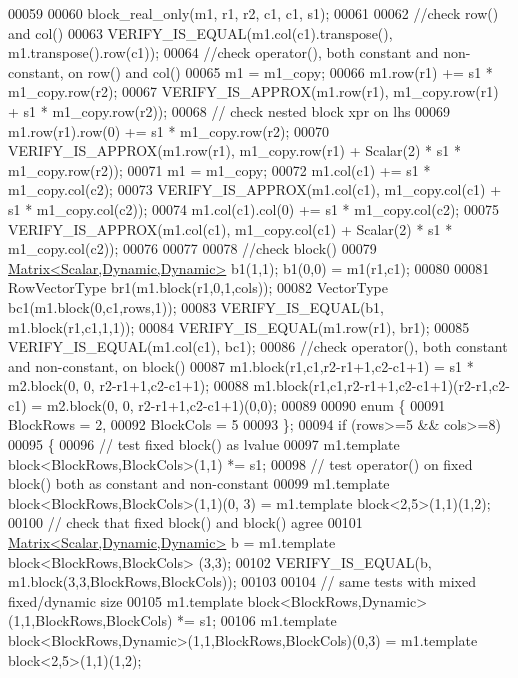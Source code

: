 \begin{DoxyCode}
00059 
00060   block\_real\_only(m1, r1, r2, c1, c1, s1);
00061 
00062   \textcolor{comment}{//check row() and col()}
00063   VERIFY\_IS\_EQUAL(m1.col(c1).transpose(), m1.transpose().row(c1));
00064   \textcolor{comment}{//check operator(), both constant and non-constant, on row() and col()}
00065   m1 = m1\_copy;
00066   m1.row(r1) += s1 * m1\_copy.row(r2);
00067   VERIFY\_IS\_APPROX(m1.row(r1), m1\_copy.row(r1) + s1 * m1\_copy.row(r2));
00068   \textcolor{comment}{// check nested block xpr on lhs}
00069   m1.row(r1).row(0) += s1 * m1\_copy.row(r2);
00070   VERIFY\_IS\_APPROX(m1.row(r1), m1\_copy.row(r1) + Scalar(2) * s1 * m1\_copy.row(r2));
00071   m1 = m1\_copy;
00072   m1.col(c1) += s1 * m1\_copy.col(c2);
00073   VERIFY\_IS\_APPROX(m1.col(c1), m1\_copy.col(c1) + s1 * m1\_copy.col(c2));
00074   m1.col(c1).col(0) += s1 * m1\_copy.col(c2);
00075   VERIFY\_IS\_APPROX(m1.col(c1), m1\_copy.col(c1) + Scalar(2) * s1 * m1\_copy.col(c2));
00076   
00077   
00078   \textcolor{comment}{//check block()}
00079   \hyperlink{group___core___module}{Matrix<Scalar,Dynamic,Dynamic>} b1(1,1); b1(0,0) = m1(r1,c1);
00080 
00081   RowVectorType br1(m1.block(r1,0,1,cols));
00082   VectorType bc1(m1.block(0,c1,rows,1));
00083   VERIFY\_IS\_EQUAL(b1, m1.block(r1,c1,1,1));
00084   VERIFY\_IS\_EQUAL(m1.row(r1), br1);
00085   VERIFY\_IS\_EQUAL(m1.col(c1), bc1);
00086   \textcolor{comment}{//check operator(), both constant and non-constant, on block()}
00087   m1.block(r1,c1,r2-r1+1,c2-c1+1) = s1 * m2.block(0, 0, r2-r1+1,c2-c1+1);
00088   m1.block(r1,c1,r2-r1+1,c2-c1+1)(r2-r1,c2-c1) = m2.block(0, 0, r2-r1+1,c2-c1+1)(0,0);
00089 
00090   \textcolor{keyword}{enum} \{
00091     BlockRows = 2,
00092     BlockCols = 5
00093   \};
00094   \textcolor{keywordflow}{if} (rows>=5 && cols>=8)
00095   \{
00096     \textcolor{comment}{// test fixed block() as lvalue}
00097     m1.template block<BlockRows,BlockCols>(1,1) *= s1;
00098     \textcolor{comment}{// test operator() on fixed block() both as constant and non-constant}
00099     m1.template block<BlockRows,BlockCols>(1,1)(0, 3) = m1.template block<2,5>(1,1)(1,2);
00100     \textcolor{comment}{// check that fixed block() and block() agree}
00101     \hyperlink{group___core___module}{Matrix<Scalar,Dynamic,Dynamic>} b = m1.template block<BlockRows,BlockCols>
      (3,3);
00102     VERIFY\_IS\_EQUAL(b, m1.block(3,3,BlockRows,BlockCols));
00103 
00104     \textcolor{comment}{// same tests with mixed fixed/dynamic size}
00105     m1.template block<BlockRows,Dynamic>(1,1,BlockRows,BlockCols) *= s1;
00106     m1.template block<BlockRows,Dynamic>(1,1,BlockRows,BlockCols)(0,3) = m1.template block<2,5>(1,1)(1,2);

\end{DoxyCode}
